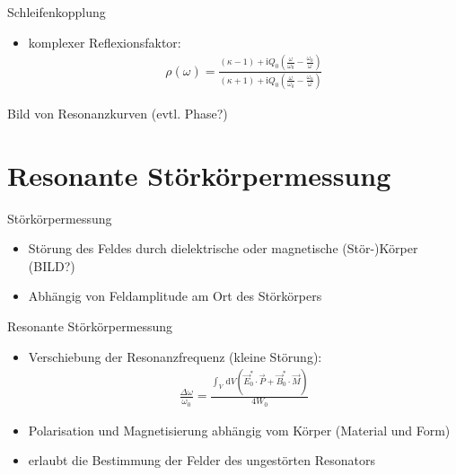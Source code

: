 \documentclass[12pt,xcolor=dvipsnames,professionalfonts]{beamer}
\begin{document}
\begin{frame}
	Schleifenkopplung
\end{frame}

\begin{frame}
	\begin{itemize}
		\item komplexer Reflexionsfaktor:
		\begin{align*}
			\rho(\omega) = \frac{(\kappa - 1) + \mathrm{i} Q_0 \left(\frac{\omega}{\omega_0} - \frac{\omega_0}{\omega}\right) }{(\kappa + 1) + \mathrm{i} Q_0 \left( \frac{\omega}{\omega_0} - \frac{\omega_0}{\omega} \right)}
		\end{align*}
	\end{itemize}
	
	Bild von Resonanzkurven (evtl. Phase?)
\end{frame}
	



\section{Resonante Störkörpermessung}

\begin{frame}{Störkörpermessung}
	\begin{itemize}
		\item Störung des Feldes durch dielektrische oder magnetische (Stör-)Körper (BILD?)
		\item Abhängig von Feldamplitude am Ort des Störkörpers
	\end{itemize}
\end{frame}

\begin{frame}{Resonante Störkörpermessung}
	\begin{itemize}
		\item Verschiebung der Resonanzfrequenz (kleine Störung):
		\begin{align*}
			\frac{\Delta \omega}{\omega_0} = \frac{\int_{V} \, \mathrm{d}V \left( \vec{E}_0^* \cdot \vec{P} + \vec{B}_0^* \cdot \vec{M} \right)}{4 W_0}
		\end{align*}
	
	\item Polarisation und Magnetisierung abhängig vom Körper (Material und Form)
	
	\item erlaubt die Bestimmung der Felder des ungestörten Resonators
	
	\end{itemize}
\end{frame}
\end{document}

